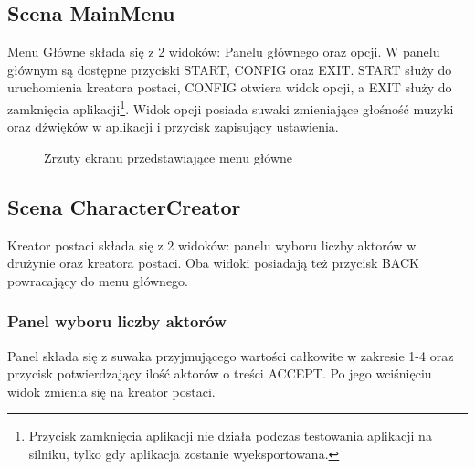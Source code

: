 \documentclass{SGGW-thesis}
\begin{document}
\subsection{Scena MainMenu}
Menu Główne składa się z 2 widoków: Panelu głównego oraz opcji. W panelu głównym są dostępne przyciski START, CONFIG oraz EXIT. START służy do uruchomienia kreatora postaci, CONFIG otwiera widok opcji, a EXIT służy do zamknięcia aplikacji\footnote{Przycisk zamknięcia aplikacji nie działa podczas testowania aplikacji na silniku, tylko gdy aplikacja zostanie wyeksportowana.}.
Widok opcji posiada suwaki zmieniające głośność muzyki oraz dźwięków w aplikacji i przycisk zapisujący ustawienia.

\begin{figure}[H]
  \hfill
  \hfill
  \hfill
  \caption{Zrzuty ekranu przedstawiające menu główne}
\end{figure}

\subsection{Scena CharacterCreator}
Kreator postaci składa się z 2 widoków: panelu wyboru liczby aktorów w drużynie oraz kreatora postaci. Oba widoki posiadają też przycisk BACK powracający do menu głównego.


\subsubsection{Panel wyboru liczby aktorów}
Panel składa się z suwaka przyjmującego wartości całkowite w zakresie 1-4 oraz przycisk potwierdzający ilość aktorów o treści ACCEPT. Po jego wciśnięciu widok zmienia się na kreator postaci.
\end{document}
